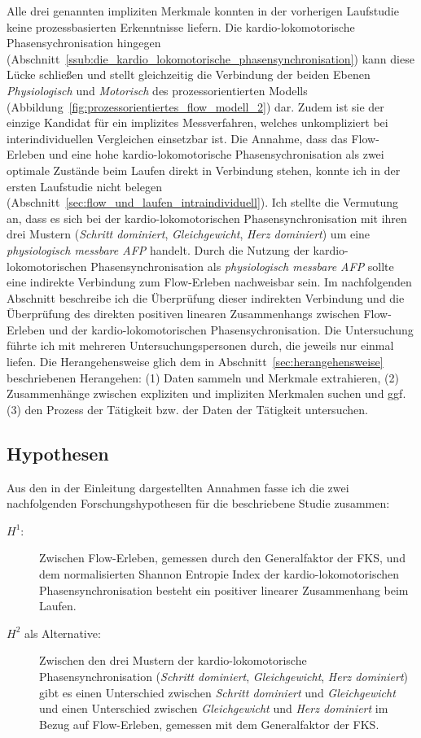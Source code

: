 Alle drei genannten impliziten Merkmale konnten in der vorherigen Laufstudie keine prozessbasierten Erkenntnisse liefern. Die kardio-lokomotorische Phasensychronisation hingegen (Abschnitt~\ref{ssub:die_kardio_lokomotorische_phasensynchronisation}) kann diese Lücke schließen und stellt gleichzeitig die Verbindung der beiden Ebenen \emph{Physiologisch} und \emph{Motorisch} des prozessorientierten Modells (Abbildung~\ref{fig:prozessorientiertes_flow_modell_2}) dar. Zudem ist sie der einzige Kandidat für ein implizites Messverfahren, welches unkompliziert bei interindividuellen Vergleichen einsetzbar ist. Die Annahme, dass das Flow-Erleben und eine hohe kardio-lokomotorische Phasensychronisation als zwei optimale Zustände beim Laufen direkt in Verbindung stehen, konnte ich in der ersten Laufstudie nicht belegen (Abschnitt~\ref{sec:flow_und_laufen_intraindividuell}). Ich stellte die Vermutung an, dass es sich bei der kardio-lokomotorischen Phasensynchronisation mit ihren drei Mustern (\emph{Schritt dominiert}, \emph{Gleichgewicht}, \emph{Herz dominiert}) um eine \emph{physiologisch messbare \ac{AFP}} handelt. Durch die Nutzung der kardio-lokomotorischen Phasensynchronisation als \emph{physiologisch messbare \ac{AFP}} sollte eine indirekte Verbindung zum Flow-Erleben nachweisbar sein. Im nachfolgenden Abschnitt beschreibe ich die Überprüfung dieser indirekten Verbindung und die Überprüfung des direkten positiven linearen Zusammenhangs zwischen Flow-Erleben und der kardio-lokomotorischen Phasensychronisation. Die Untersuchung führte ich mit mehreren Untersuchungspersonen durch, die jeweils nur einmal liefen. Die Herangehensweise glich dem in Abschnitt~\ref{sec:herangehensweise} beschriebenen Herangehen: (1) Daten sammeln und Merkmale extrahieren, (2) Zusammenhänge zwischen expliziten und impliziten Merkmalen suchen und ggf. (3) den Prozess der Tätigkeit bzw. der Daten der Tätigkeit untersuchen. 

\subsection{Hypothesen} 

\label{sub:hypothesen}

Aus den in der Einleitung dargestellten Annahmen fasse ich die zwei nachfolgenden Forschungshypothesen für die beschriebene Studie zusammen: 
\begin{description}
	\item[$H^1$:] Zwischen Flow-Erleben, gemessen durch den Generalfaktor der \ac{FKS}, und dem normalisierten Shannon Entropie Index der kardio-lokomotorischen Phasensynchronisation besteht ein positiver linearer Zusammenhang beim Laufen. 
	\item[$H^2$ als Alternative:]  Zwischen den drei Mustern der kardio-lokomotorische Phasensynchronisation (\emph{Schritt dominiert}, \emph{Gleichgewicht}, \emph{Herz dominiert}) gibt es einen Unterschied zwischen \emph{Schritt dominiert} und \emph{Gleichgewicht} und einen Unterschied zwischen \emph{Gleichgewicht} und \emph{Herz dominiert} im Bezug auf Flow-Erleben, gemessen mit dem Generalfaktor der \ac{FKS}. 
\end{description}

